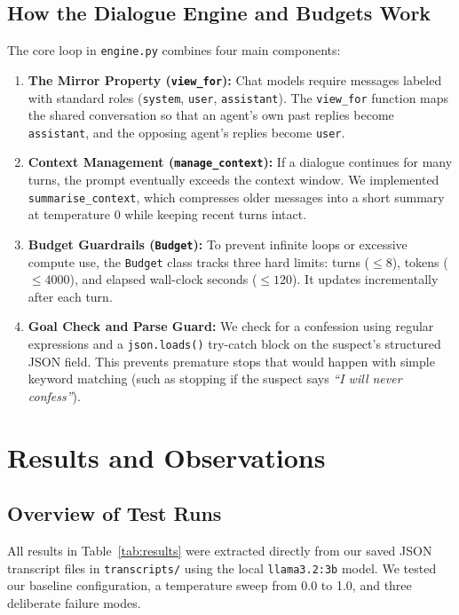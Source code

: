 \documentclass[11pt,a4paper]{article}
\begin{document}
\subsection{How the Dialogue Engine and Budgets Work}
The core loop in \texttt{engine.py} combines four main components:
\begin{enumerate}
    \item \textbf{The Mirror Property (\texttt{view\_for}):} Chat models require messages labeled with standard roles (\texttt{system}, \texttt{user}, \texttt{assistant}). The \texttt{view\_for} function maps the shared conversation so that an agent's own past replies become \texttt{assistant}, and the opposing agent's replies become \texttt{user}.
    \item \textbf{Context Management (\texttt{manage\_context}):} If a dialogue continues for many turns, the prompt eventually exceeds the context window. We implemented \texttt{summarise\_context}, which compresses older messages into a short summary at temperature 0 while keeping recent turns intact.
    \item \textbf{Budget Guardrails (\texttt{Budget}):} To prevent infinite loops or excessive compute use, the \texttt{Budget} class tracks three hard limits: turns ($\le 8$), tokens ($\le 4000$), and elapsed wall-clock seconds ($\le 120$). It updates incrementally after each turn.
    \item \textbf{Goal Check and Parse Guard:} We check for a confession using regular expressions and a \texttt{json.loads()} try-catch block on the suspect's structured JSON field. This prevents premature stops that would happen with simple keyword matching (such as stopping if the suspect says \textit{``I will never confess''}).
\end{enumerate}

\section{Results and Observations}

\subsection{Overview of Test Runs}
All results in Table~\ref{tab:results} were extracted directly from our saved JSON transcript files in \texttt{transcripts/} using the local \texttt{llama3.2:3b} model. We tested our baseline configuration, a temperature sweep from 0.0 to 1.0, and three deliberate failure modes.
\end{document}
